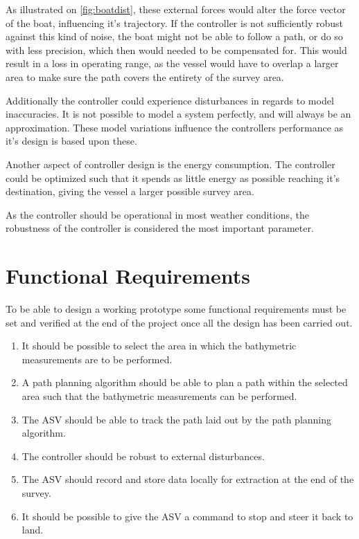 As illustrated on \autoref{fig:boatdist}, these external forces would alter the force vector of the boat, influencing it's trajectory. 
If the controller is not sufficiently robust against this kind of noise, the boat might not be able to follow a path, or do so with less precision, which then would needed to be compensated for. 
This would result in a loss in operating range, as the vessel would have to overlap a larger area to make sure the path covers the entirety of the survey area.

Additionally the controller could experience disturbances in regards to model inaccuracies. 
It is not possible to model a system perfectly, and will always be an approximation. 
These model variations influence the controllers performance as it's design is based upon these. 

Another aspect of controller design is the energy consumption. 
The controller could be optimized such that it spends as little energy as possible reaching it's destination, giving the vessel a larger possible survey area. 

As the controller should be operational in most weather conditions, the robustness of the controller is considered the most important parameter. 





\section{Functional Requirements} \label{sec:requirements}
To be able to design a working prototype some functional requirements must be set and verified at the end of the project once all the design has been carried out.
%
\begin{enumerate}
  \item It should be possible to select the area in which the bathymetric measurements are to be performed.
  \item A path planning algorithm should be able to plan a path within the selected area such that the bathymetric measurements can be performed.
  \item The ASV should be able to track the path laid out by the path planning algorithm.
  \item The controller should be robust to external disturbances.
  \item The ASV should record and store data locally for extraction at the end of the survey.
  \item It should be possible to give the ASV a command to stop and steer it back to land.
\end{enumerate}
%






